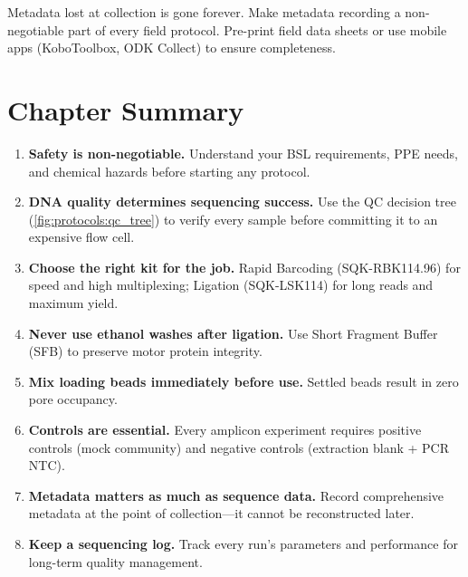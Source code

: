 \begin{warningbox}[title={Metadata Cannot Be Reconstructed}]
Metadata lost at collection is gone forever. Make metadata recording a non-negotiable part of every field protocol. Pre-print field data sheets or use mobile apps (KoboToolbox, ODK Collect) to ensure completeness.
\end{warningbox}

\section{Chapter Summary}
\label{sec:protocols:summary}

\begin{keyconcept}[title={Key Takeaways}]
\begin{enumerate}[nosep]
  \item \textbf{Safety is non-negotiable.} Understand your BSL requirements, PPE needs, and chemical hazards before starting any protocol.
  \item \textbf{DNA quality determines sequencing success.} Use the \acrshort{QC} decision tree (\cref{fig:protocols:qc_tree}) to verify every sample before committing it to an expensive flow cell.
  \item \textbf{Choose the right kit for the job.} Rapid Barcoding (SQK-RBK114.96) for speed and high multiplexing; Ligation (SQK-LSK114) for long reads and maximum yield.
  \item \textbf{Never use ethanol washes after ligation.} Use Short Fragment Buffer (SFB) to preserve motor protein integrity.
  \item \textbf{Mix loading beads immediately before use.} Settled beads result in zero pore occupancy.
  \item \textbf{Controls are essential.} Every amplicon experiment requires positive controls (mock community) and negative controls (extraction blank + \acrshort{PCR} NTC).
  \item \textbf{Metadata matters as much as sequence data.} Record comprehensive metadata at the point of collection---it cannot be reconstructed later.
  \item \textbf{Keep a sequencing log.} Track every run's parameters and performance for long-term quality management.
\end{enumerate}
\end{keyconcept}
